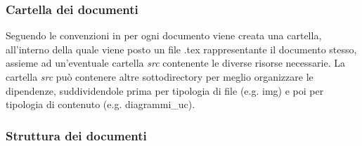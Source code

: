 \begin{itemize}
\end{itemize}

\subsubsection{Cartella dei documenti}
\label{ssub:cartella_doc}

Seguendo le convenzioni in  per ogni documento viene creata una cartella, all'interno della quale viene posto
un file .tex rappresentante il documento stesso, assieme ad un'eventuale cartella \emph{src} contenente le diverse risorse necessarie.
La cartella \emph{src} può contenere altre sottodirectory per meglio organizzare le dipendenze, suddividendole prima per tipologia di file
(e.g. img) e poi per tipologia di contenuto (e.g. diagrammi\_uc).

\subsubsection{Struttura dei documenti}
\label{ssub:struttura_doc}

